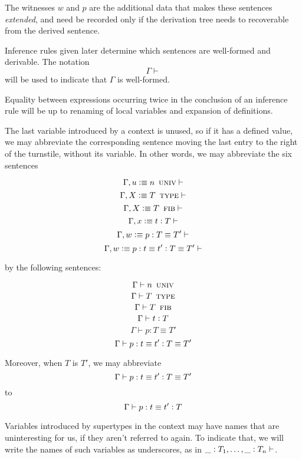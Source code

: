 \documentclass[11pt]{article}
\newcommand{\eqd}{\equiv}
\newcommand{\ccolon}{\vcentcolon}
\newcommand{\ccheck}{\vcentcolon}            %
\newcommand{\csynth}{\vcentcolon\vcentcolon} %
\renewcommand{\csynth}{\ccheck}              %
\newcommand{\UNIV}{\mathop{\text{ \sc univ}}}
\newcommand{\TYPE}{\mathop{\text{ \sc type}}}
\newcommand{\FTYPE}{\mathop{\text{ \sc fib}}}
\newcommand{\Okay}{\mathop{\text{ \sc okay}}}
\newcommand{\Context}{\vdash\Okay}
\renewcommand{\Context}{\vdash}
\newcommand{\var}{\char`_}
\newcommand{\defn}{\vcentcolon\equiv}
\begin{document}
The witnesses $w$ and $p$ are the additional data that makes these sentences
{\em extended}, and need be recorded only if the derivation tree needs to
recoverable from the derived sentence.

Inference rules given later determine which sentences are well-formed and
derivable.  The notation $$\Gamma \Context$$ will be used to indicate that
$\Gamma$ is well-formed.

Equality between expressions occurring twice in the conclusion of an inference
rule will be up to renaming of local variables and expansion of definitions.

The last variable introduced by a context is unused, so if it has a defined
value, we may abbreviate the corresponding sentence moving the last entry to
the right of the turnstile, without its variable.  In other words, we may
abbreviate the six sentences

$$ \Gamma, u \defn n \UNIV \Context $$
$$ \Gamma, X \defn T \TYPE \Context $$
$$ \Gamma, X \defn T \FTYPE \Context $$
$$ \Gamma, x \defn t \ccolon T \Context $$
$$ \Gamma, w \defn p : T \eqd T' \Context $$
$$ \Gamma, w \defn p : t \eqd t' \ccolon T \eqd T' \Context $$

by the following sentences:

$$ \Gamma \vdash n \UNIV $$
$$ \Gamma \vdash T \TYPE $$
$$ \Gamma \vdash T \FTYPE $$
$$ \Gamma \vdash t \ccolon T $$
$$ \Gamma \vdash p : T \eqd T' $$
$$ \Gamma \vdash p : t \eqd t' \ccolon T \eqd T' $$

Moreover, when $T$ is $T'$, we may abbreviate
$$ \Gamma \vdash p : t \eqd t' \ccolon T \eqd T' $$
to
$$ \Gamma \vdash p : t \eqd t' \ccolon T $$

Variables introduced by supertypes in the context may have names that are
uninteresting for us, if they aren't referred to again.  To indicate that, we
will write the names of such variables as underscores, as in $\var
\ccolon T_1,\dots,\var \ccolon T_n\Context$.





\end{document}
